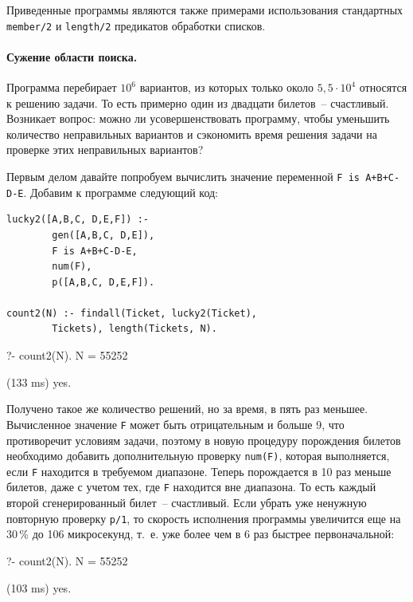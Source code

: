 \documentclass[a4paper,14pt, openany, twoside, draft]{extbook} %
\begin{document}
Приведенные программы являются также примерами использования стандартных \texttt{member/2} и \texttt{length/2} предикатов обработки списков.

\paragraph{Сужение области поиска.} Программа перебирает $10^6$ вариантов, из которых только около $5,5\cdot 10^4$ относятся к решению задачи. То есть примерно один из двадцати билетов~-- счастливый. Возникает вопрос: можно ли усовершенствовать программу, чтобы уменьшить количество неправильных вариантов и сэкономить время решения задачи на проверке этих неправильных вариантов?

Первым делом давайте попробуем вычислить значение переменной \texttt{F is A+B+C-D-E}. Добавим к программе следующий код:

\begin{verbatim}
lucky2([A,B,C, D,E,F]) :-
        gen([A,B,C, D,E]),
        F is A+B+C-D-E,
        num(F),
        p([A,B,C, D,E,F]).

count2(N) :- findall(Ticket, lucky2(Ticket),
        Tickets), length(Tickets, N).
\end{verbatim}

\begin{proexp}
?- count2(N).
N = 55252

(133 ms) yes.
\end{proexp}

Получено такое же количество решений, но за время, в пять раз меньшее. Вычисленное значение \texttt{F} может быть отрицательным и больше 9, что противоречит условиям задачи, поэтому в новую процедуру порождения билетов необходимо добавить дополнительную проверку \texttt{num(F)}, которая выполняется, если \texttt{F} находится в требуемом диапазоне. Теперь порождается в 10 раз меньше билетов, даже с учетом тех, где \texttt{F} находится вне диапазона. То есть каждый второй сгенерированный билет~-- счастливый.  Если убрать уже ненужную повторную проверку \texttt{p/1}, то скорость исполнения программы увеличится еще на 30\,{}\% до 106 микросекунд, т.~е. уже более чем в 6 раз быстрее первоначальной:

\begin{proexp}
?- count2(N).
N = 55252

(103 ms) yes.
\end{proexp}
\end{document}
